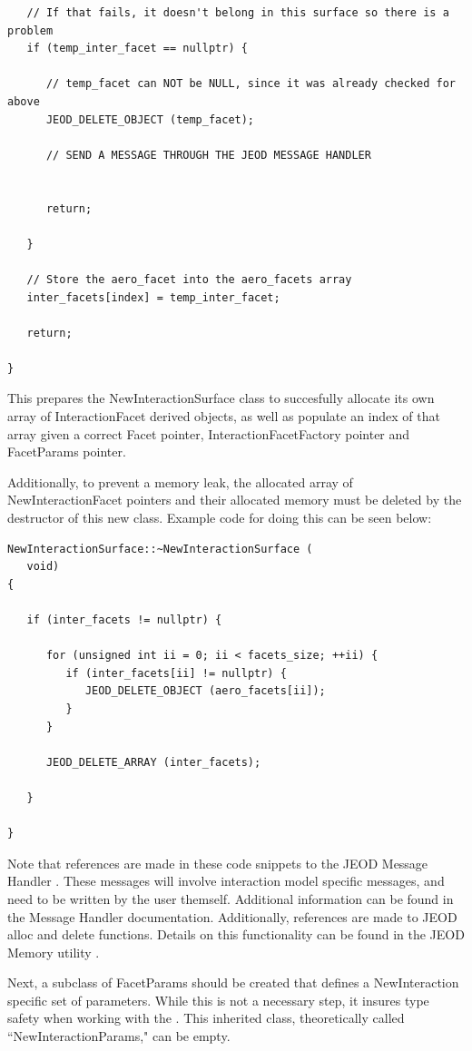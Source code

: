 \begin{verbatim}
   // If that fails, it doesn't belong in this surface so there is a problem
   if (temp_inter_facet == nullptr) {

      // temp_facet can NOT be NULL, since it was already checked for above
      JEOD_DELETE_OBJECT (temp_facet);

      // SEND A MESSAGE THROUGH THE JEOD MESSAGE HANDLER


      return;

   }

   // Store the aero_facet into the aero_facets array
   inter_facets[index] = temp_inter_facet;

   return;

}
\end{verbatim}

This prepares the NewInteractionSurface class to succesfully allocate its
own array of InteractionFacet derived objects, as well as populate an
index of that array given a correct Facet pointer, InteractionFacetFactory
pointer and FacetParams pointer.

Additionally, to prevent a memory leak, the allocated array of
NewInteractionFacet pointers and their allocated memory must be
deleted by the destructor of this new class. Example code for doing this
can be seen below:

\begin{verbatim}
NewInteractionSurface::~NewInteractionSurface (
   void)
{

   if (inter_facets != nullptr) {

      for (unsigned int ii = 0; ii < facets_size; ++ii) {
         if (inter_facets[ii] != nullptr) {
            JEOD_DELETE_OBJECT (aero_facets[ii]);
         }
      }

      JEOD_DELETE_ARRAY (inter_facets);

   }

}
\end{verbatim}

Note that references are made in these code snippets 
to the JEOD Message Handler
\cite{dynenv:MESSAGE}. These messages will involve interaction model
specific messages, and need to be written by the user themself. Additional
information can be found in the Message Handler documentation. Additionally,
references are made to JEOD alloc and delete functions. Details on this
functionality can be found in the JEOD Memory utility
\cite{dynenv:MEMORY}.

Next, a subclass of FacetParams should be created that defines a
NewInteraction specific set of parameters. While this is not a necessary
step, it insures type safety when working with the \ModelDesc.
This inherited class, theoretically called ``NewInteractionParams," can be
empty.

